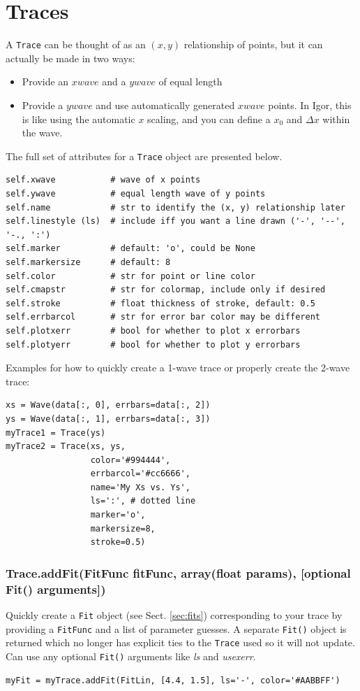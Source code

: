 \documentclass[10pt]{report}
\begin{document}
\section{Traces}
A \texttt{Trace} can be thought of as an $(x, y)$ relationship of points, but it can actually be made in two ways:
\begin{itemize}
	\item Provide an $xwave$ and a $ywave$ of equal length
	\item Provide a $ywave$ and use automatically generated $xwave$ points. In Igor, this is like using the automatic $x$ scaling, and you can define a $x_0$ and $\Delta x$ within the wave.
\end{itemize} The full set of attributes for a \texttt{Trace} object are presented below.
\begin{lstlisting}[caption={Trace() properties}, style=properties]
self.xwave           # wave of x points
self.ywave           # equal length wave of y points
self.name            # str to identify the (x, y) relationship later
self.linestyle (ls)  # include iff you want a line drawn ('-', '--', '-., ':')
self.marker          # default: 'o', could be None
self.markersize      # default: 8
self.color           # str for point or line color
self.cmapstr         # str for colormap, include only if desired
self.stroke          # float thickness of stroke, default: 0.5
self.errbarcol       # str for error bar color may be different
self.plotxerr        # bool for whether to plot x errorbars
self.plotyerr        # bool for whether to plot y errorbars
\end{lstlisting}

Examples for how to quickly create a 1-wave trace or properly create the 2-wave trace:
\begin{lstlisting}[caption=Trace() creation]
xs = Wave(data[:, 0], errbars=data[:, 2])
ys = Wave(data[:, 1], errbars=data[:, 3])
myTrace1 = Trace(ys)
myTrace2 = Trace(xs, ys,
                 color='#994444',
                 errbarcol='#cc6666',
                 name='My Xs vs. Ys',
                 ls=':', # dotted line
                 marker='o',
                 markersize=8,
                 stroke=0.5)
\end{lstlisting}


\subsubsection*{Trace.\textbf{addFit}({\color{args}FitFunc \textbf{fitFunc}, array(float \textbf{params}), [optional Fit() arguments]})}
Quickly create a \texttt{Fit} object (see Sect. \ref{sec:fits}) corresponding to your trace by providing a \texttt{FitFunc} and a list of parameter guesses. A separate \texttt{Fit()} object is returned which no longer has explicit ties to the \texttt{Trace} used so it will not update. Can use any optional \texttt{Fit()} arguments like \textit{ls} and \textit{usexerr}.
\begin{lstlisting}[caption=Add Fit to Trace]
myFit = myTrace.addFit(FitLin, [4.4, 1.5], ls='-', color='#AABBFF')
\end{lstlisting}
\end{document}
